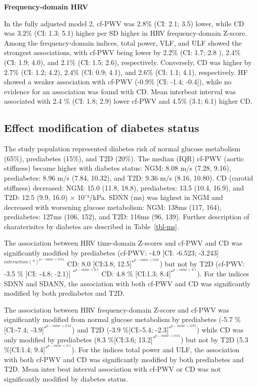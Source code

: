 \documentclass[
  a4paper,
  headsepline=true,
  open=any]{scrbook}
\begin{document}
\textbf{Frequency-domain HRV}

In the fully adjusted model 2, cf-PWV was 2.8\% (CI: 2.1; 3.5) lower,
while CD was 3.2\% (CI: 1.3; 5.1) higher per SD higher in HRV
frequency-domain Z-score. Among the frequency-domain indices, total
power, VLF, and ULF showed the strongest associations, with cf-PWV being
lower by 2.2\% (CI: 1.7; 2.8 ), 2.4\% (CI: 1.9; 4.0), and 2.1\% (CI:
1.5; 2.6), respectively. Conversely, CD was higher by 2.7\% (CI: 1.2;
4.2), 2.4\% (CI: 0.9; 4.1), and 2.6\% (CI: 1.1; 4.1), respectively. HF
showed a weaker association with cf-PWV (-0.9\% {[}CI: -1.4; -0.4{]}),
while no evidence for an association was found with CD. Mean interbeat
interval was associated with 2.4 \% (CI: 1.8; 2.9) lower cf-PWV and
4.5\% (3.1; 6.1) higher CD.

\hypertarget{effect-modification-of-diabetes-status}{%
\subsection{Effect modification of diabetes
status}\label{effect-modification-of-diabetes-status}}

The study population represented diabetes risk of normal glucose
metabolism (65\%), prediabetes (15\%), and T2D (20\%). The median (IQR)
cf-PWV (aortic stiffness) became higher with diabetes status: NGM: 8.08
m/s (7.28, 9.16), prediabetes: 8.96 m/s (7.84, 10.32), and T2D: 9.36 m/s
(8.16, 10.80). CD (carotid stiffness) decreased: NGM: 15.0 (11.8, 18.8),
prediabetes: 13.5 (10.4, 16.9), and T2D: 12.5 (9.9, 16.0) × 10⁻³/kPa.
SDNN (ms) was highest in NGM and decreased with worsening glucose
metabolism: NGM: 138ms (117, 164), prediabetes: 127ms (106, 152), and
T2D: 116ms (96, 139). Further description of charaterisitcs by diabetes
are described in Table~\ref{tbl-ms}.

The association between HRV time-domain Z-scores and cf-PWV and CD was
significantly modified by prediabetes (cf-PWV: -4.9 {[}CI: -6.523;
-3.243{]} \(^{interaction(*) ^{p-value< 0.01}}\) CD: 8.0 {[}CI:3.8;
12.5{]}\(^{*^{p-value< 0.01}}\)) but not by T2D (cf-PWV: -3.5 \% {[}CI:
-4.8; -2.1){]} \(^{*^{p-value< 0.1}}\) CD: 4.8 \% {[}CI:1.3;
8.4{]}\(^{*^{p-value< 0.1}}\)). For the indices SDNN and SDANN, the
association with both cf-PWV and CD was significantly modified by both
prediabetes and T2D.

The association between HRV frequency-domain Z-score and cf-PWV was
significantly modified from normal glucose metabolism by prediabetes
(-5.7 \%{[}CI:-7.4; -3.9{]}\(^{*^{p-value< 0.01}}\)) and T2D (-3.9
\%{[}CI:-5.4; -2.3{]}\(^{*^{p-value< 0.05}}\)) while CD was only
modified by prediabetes (8.3 \%{[}CI:3.6;
13.2{]}\(^{*^{p-value< 0.01}}\)) but not by T2D (5.3 \%{[}CI:1.4;
9.4{]}\(^{*^{p-value< 0.1}}\)). For the indices total power and ULF, the
association with both cf-PWV and CD was significantly modified by both
prediabetes and T2D. Mean inter beat interval association with cf-PWV or
CD was not significantly modified by diabetes status.
\end{document}
